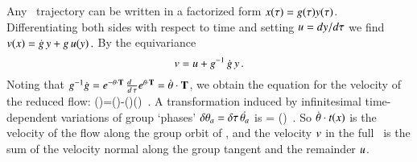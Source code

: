

Any \statesp\ trajectory can be written in a factorized
form $x(\tau)=g(\tau)
y(\tau)$. Differentiating both sides with respect to time and
setting $u={dy}/{d\tau}$ we find
\(
v(x)=\dot{g} \, y+g \, u(y)
\,.
\)
By the equivariance 
\[
v=u + g^{-1} \, \dot{g} \, y
\,.
\]
Noting that $g^{-1}\dot{g}=e^{-{\bf \theta} \cdot \mathbf{T}} \,
\frac{d ~~}{d \, \tau} e^{{\bf \theta} \cdot \mathbf{T}}=\dot{{\bf \theta}}\cdot \mathbf{T}$,
we obtain the equation for the velocity of the reduced flow:
\beq
\velRed(\sspRed)=\vel(\sspRed)-\dot{\gSpace}(\sspRed)\cdot \groupTan(\sspRed)
\,.
A transformation induced by infinitesimal
time-dependent variations  of group `phases'
$\delta {\bf \theta}_a = {\delta \tau} \, \dot{{\bf \theta}_a}$ is
\beq
\dot{\ssp} = \dot{\gSpace} \cdot \groupTan(\ssp)
\,.
So $\dot{{\bf \theta}} \cdot t(x)$ is the velocity
of the flow along the group orbit of \ssp, and
the velocity $v$ in the full \statesp\ is the sum of
the velocity normal along the group tangent and the remainder $u$.


